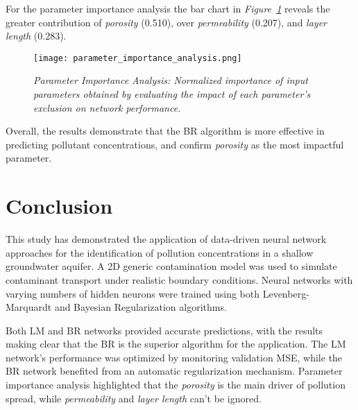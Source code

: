 \documentclass[10pt]{article}
\begin{document}
	For the parameter importance analysis the bar chart in \textit{Figure~\ref{fig:param_imp}} reveals the greater contribution of \textit{porosity} (0.510), over \textit{permeability} (0.207), and \textit{layer length} (0.283).
	\begin{figure}[H]
		\centering
		\texttt{[image: parameter\_importance\_analysis.png]}
		\caption{\textit{Parameter Importance Analysis: Normalized importance of input parameters obtained by evaluating the impact of each parameter's exclusion on network performance.}}
		\label{fig:param_imp}
	\end{figure}
	Overall, the results demonstrate that the BR algorithm is more effective in predicting pollutant concentrations, and confirm \textit{porosity} as the most impactful parameter.
	
	\section{Conclusion}
	This study has demonstrated the application of data-driven neural network approaches for the identification of pollution concentrations in a shallow groundwater aquifer. A 2D generic contamination model was used to simulate contaminant transport under realistic boundary conditions. Neural networks with varying numbers of hidden neurons were trained using both Levenberg-Marquardt and Bayesian Regularization algorithms. 
	
	Both LM and BR networks provided accurate predictions, with the results making clear that the BR is the superior algorithm for the application. The LM network’s performance was optimized by monitoring validation MSE, while the BR network benefited from an automatic regularization mechanism. Parameter importance analysis highlighted that the \textit{porosity} is the main driver of pollution spread, while \textit{permeability} and \textit{layer length} can't be ignored.
	
	
	
\end{document}
